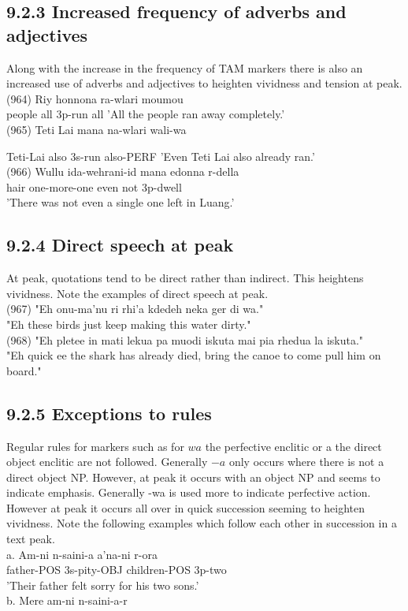 \documentclass[10pt]{article}
\begin{document}
\subsection*{9.2.3 Increased frequency of adverbs and adjectives}
Along with the increase in the frequency of TAM markers there is also an increased use of adverbs and adjectives to heighten vividness and tension at peak.\\
(964) Riy honnona ra-wlari moumou\\
people all 3p-run all 'All the people ran away completely.'\\
(965) Teti Lai mana na-wlari wali-wa

Teti-Lai also 3s-run also-PERF 'Even Teti Lai also already ran.'\\
(966) Wullu ida-wehrani-id mana edonna r-della\\
hair one-more-one even not 3p-dwell\\
'There was not even a single one left in Luang.'

\subsection*{9.2.4 Direct speech at peak}
At peak, quotations tend to be direct rather than indirect. This heightens vividness. Note the examples of direct speech at peak.\\
(967) "Eh onu-ma'nu ri rhi'a kdedeh neka ger di wa."\\
"Eh these birds just keep making this water dirty."\\
(968) "Eh pletee in mati lekua pa muodi iskuta mai pia rhedua la iskuta."\\
"Eh quick ee the shark has already died, bring the canoe to come pull him on board."

\subsection*{9.2.5 Exceptions to rules}
Regular rules for markers such as for \(w a\) the perfective enclitic or a the direct object enclitic are not followed. Generally \(-a\) only occurs where there is not a direct object NP. However, at peak it occurs with an object NP and seems to indicate emphasis. Generally -wa is used more to indicate perfective action. However at peak it occurs all over in quick succession seeming to heighten vividness. Note the following examples which follow each other in succession in a text peak.\\
a. Am-ni n-saini-a a'na-ni r-ora\\
father-POS 3s-pity-OBJ children-POS 3p-two\\
'Their father felt sorry for his two sons.'\\
b. Mere am-ni n-saini-a-r
\end{document}
